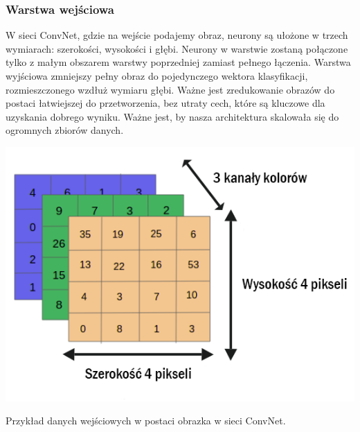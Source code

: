 \documentclass[12pt,a4paper]{article}
\begin{document}
    \subsubsection{Warstwa wejściowa}
    
    W sieci ConvNet, gdzie na wejście podajemy obraz, neurony są ułożone w trzech wymiarach: szerokości, wysokości i głębi. Neurony w warstwie zostaną połączone tylko z małym obszarem warstwy poprzedniej zamiast pełnego łączenia. Warstwa wyjściowa zmniejszy pełny obraz do pojedynczego wektora klasyfikacji, rozmieszczonego wzdłuż wymiaru głębi. Ważne jest zredukowanie obrazów do postaci łatwiejszej do przetworzenia, bez utraty cech, które są kluczowe dla uzyskania dobrego wyniku. Ważne jest, by nasza architektura skalowała się do ogromnych zbiorów danych.
    \begin{center}
        \includegraphics[scale=0.5]{input.png}
        \begin{flushright}
            \begin{scriptsize}
            Przykład danych wejściowych w postaci obrazka w sieci ConvNet.
            \end{scriptsize}
        \end{flushright}
    \end{center}
\end{document}
